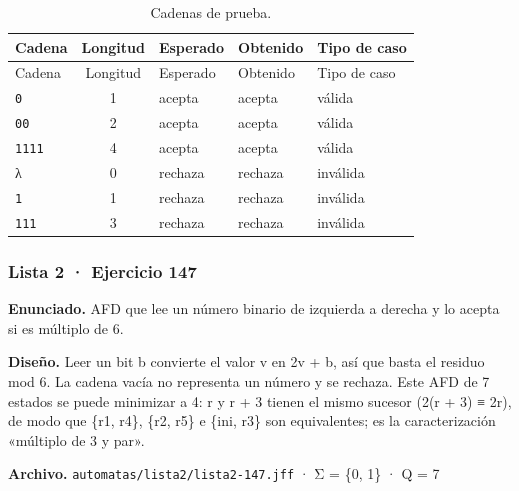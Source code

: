\begin{longtable}[]{@{}lclll@{}}
\caption{Cadenas de prueba.}\tabularnewline
\toprule\noalign{}
Cadena & Longitud & Esperado & Obtenido & Tipo de caso \\
\midrule\noalign{}
\endfirsthead
\toprule\noalign{}
Cadena & Longitud & Esperado & Obtenido & Tipo de caso \\
\midrule\noalign{}
\endhead
\bottomrule\noalign{}
\endlastfoot
\texttt{0} & 1 & acepta & acepta & válida \\
\texttt{00} & 2 & acepta & acepta & válida \\
\texttt{1111} & 4 & acepta & acepta & válida \\
λ & 0 & rechaza & rechaza & inválida \\
\texttt{1} & 1 & rechaza & rechaza & inválida \\
\texttt{111} & 3 & rechaza & rechaza & inválida \\
\end{longtable}


\hypertarget{lista-2-ejercicio-147}{%
\subsubsection{Lista 2 · Ejercicio 147}\label{lista-2-ejercicio-147}}

\textbf{Enunciado.} AFD que lee un número binario de izquierda a derecha y lo acepta si es múltiplo de 6.

\textbf{Diseño.} Leer un bit b convierte el valor v en 2v + b, así que basta el residuo mod 6. La cadena vacía no representa un número y se rechaza. Este AFD de 7 estados se puede minimizar a 4: r y r + 3 tienen el mismo sucesor (2(r + 3) ≡ 2r), de modo que \{r1, r4\}, \{r2, r5\} e \{ini, r3\} son equivalentes; es la caracterización «múltiplo de 3 y par».

\textbf{Archivo.} \texttt{automatas/lista2/lista2-147.jff} · Σ = \{0, 1\} · \textbar Q\textbar{} = 7

